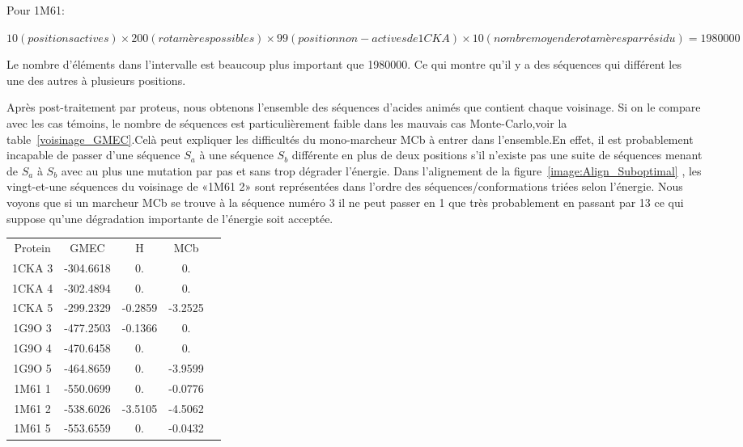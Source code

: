 Pour 1M61:

$10 (positions actives) \times 200 (rotamères possibles) \times 99 (position non-actives de 1CKA) \times 10 (nombre moyen de rotamères par résidu)=1980000 $

Le nombre d'éléments dans l'intervalle est beaucoup plus important que 1980000. Ce qui montre qu'il y a des séquences qui différent les une des autres à plusieurs positions.

Après post-traitement par proteus, nous obtenons l'ensemble des séquences d'acides animés que contient chaque voisinage. Si on le compare avec les cas témoins, le nombre de séquences est particulièrement faible dans les mauvais cas Monte-Carlo,voir la table~\ref{voisinage_GMEC}.Celà peut expliquer les difficultés du mono-marcheur MCb à entrer dans l'ensemble.En effet, il est probablement incapable de passer d'une séquence $S_a$ à une séquence $S_b$ différente en plus de deux positions s'il n'existe pas une suite de séquences menant de $S_a$ à $S_b$ avec au plus une mutation par pas et sans trop dégrader l'énergie. Dans l'alignement de la figure~\ref{image:Align_Suboptimal} , les vingt-et-une séquences du voisinage de «1M61 2» sont représentées dans l'ordre des séquences/conformations triées selon l'énergie. Nous voyons que si un marcheur MCb se trouve à la séquence numéro 3 il ne peut passer en 1 que très probablement en passant par 13 ce qui suppose qu'une dégradation importante de l'énergie soit acceptée.   

    \begin{table}[h]
      \centering

      \begin{tabular}{ccccc}


        \toprule
        Protein & GMEC & H & MCb \\
        \cmidrule{1-5}
        1CKA 3 & -304.6618 & 0. & 0. \\
        1CKA 4 & -302.4894 & 0. & 0. \\
        1CKA 5 & -299.2329 & -0.2859 & -3.2525 \\
        1G9O 3 & -477.2503 & -0.1366 & 0. \\
        1G9O 4 & -470.6458 & 0. & 0. \\
        1G9O 5 & -464.8659 & 0. & -3.9599 \\
        1M61 1 & -550.0699 & 0. & -0.0776 \\
        1M61 2 & -538.6026 & -3.5105 & -4.5062 \\
        1M61 5 & -553.6559 & 0. & -0.0432 \\
        \bottomrule       
      \end{tabular}      
\label{tab:voisinage_GMEC}      
    \end{table}


